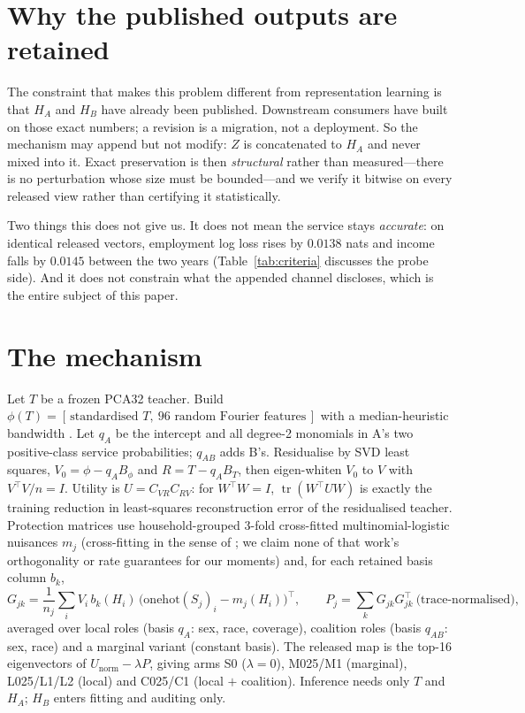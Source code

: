 \documentclass[10pt]{article}
\begin{document}
\section{Why the published outputs are retained}
\label{sec:retained}

The constraint that makes this problem different from representation learning is that
$H_A$ and $H_B$ have already been published. Downstream consumers have built on those exact numbers;
a revision is a migration, not a deployment. So the mechanism may append but not modify:
$Z$ is concatenated to $H_A$ and never mixed into it. Exact preservation is then \emph{structural}
rather than measured---there is no perturbation whose size must be bounded---and we verify it
bitwise on every released view rather than certifying it statistically.

Two things this does not give us. It does not mean the service stays \emph{accurate}: on identical
released vectors, employment log loss rises by $0.0138$ nats and income falls by $0.0145$ between the
two years (Table~\ref{tab:criteria} discusses the probe side). And it does not constrain what the
appended channel discloses, which is the entire subject of this paper.

\section{The mechanism}
\label{sec:method}

Let $T$ be a frozen PCA32 teacher. Build $\phi(T)=[\,\text{standardised }T,\ 96 \text{ random Fourier
features}\,]$ with a median-heuristic bandwidth \citep{rahimi2007random}. Let $q_A$ be the intercept
and all degree-2 monomials in A's two positive-class service probabilities; $q_{AB}$ adds B's.
Residualise by SVD least squares, $V_0=\phi-q_A B_\phi$ and $R=T-q_A B_T$, then eigen-whiten $V_0$ to
$V$ with $V^\top V/n=I$. Utility is $U=C_{VR}C_{RV}$: for $W^\top W=I$, $\operatorname{tr}(W^\top UW)$
is exactly the training reduction in least-squares reconstruction error of the residualised teacher.
Protection matrices use household-grouped 3-fold cross-fitted multinomial-logistic nuisances $m_j$
(cross-fitting in the sense of \citealp{chernozhukov2016dml}; we claim none of that work's
orthogonality or rate guarantees for our moments)
and, for each retained basis column $b_k$,
\[
G_{jk}=\frac{1}{n_j}\sum_i V_i\, b_k(H_i)\,\bigl(\mathrm{onehot}(S_j)_i-m_j(H_i)\bigr)^{\!\top},
\qquad P_j=\textstyle\sum_k G_{jk}G_{jk}^{\top}\ \text{(trace-normalised)},
\]
averaged over local roles (basis $q_A$: sex, race, coverage), coalition roles (basis $q_{AB}$: sex,
race) and a marginal variant (constant basis). The released map is the top-16 eigenvectors of
$U_{\mathrm{norm}}-\lambda P$, giving arms S0 ($\lambda=0$), M025/M1 (marginal), L025/L1/L2 (local)
and C025/C1 (local $+$ coalition). Inference needs only $T$ and $H_A$; $H_B$ enters fitting and
auditing only.
\end{document}
